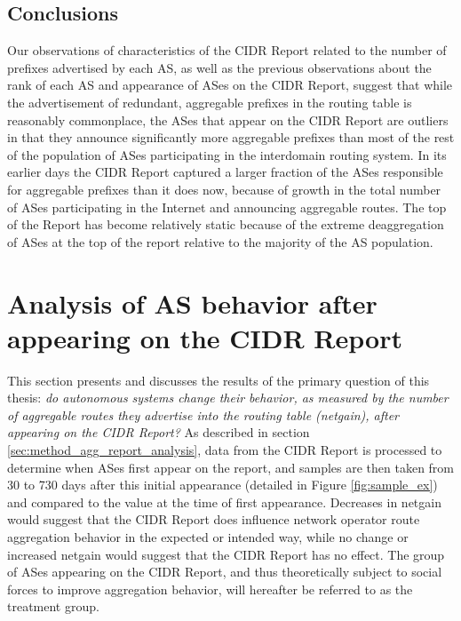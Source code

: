 
\subsection{Conclusions}

Our observations of characteristics of the CIDR Report related to the number of
prefixes advertised by each AS, as well as the previous observations about the
rank of each AS and appearance of ASes on the CIDR Report, suggest that while
the advertisement of redundant, aggregable prefixes in the routing table is
reasonably commonplace, the ASes that appear on the CIDR Report are outliers in
that they announce significantly more aggregable prefixes than most of the rest
of the population of ASes participating in the interdomain routing system. In
its earlier days the CIDR Report captured a larger fraction of the ASes
responsible for aggregable prefixes than it does now, because of growth in the
total number of ASes participating in the Internet and announcing aggregable
routes. The top of the Report has become relatively static because of the
extreme deaggregation of ASes at the top of the report relative to the majority
of the AS population.

\section{Analysis of AS behavior after appearing on the CIDR Report}

This section presents and discusses the results of the primary question of this
thesis: \emph{do autonomous systems change their behavior, as measured by the
number of aggregable routes they advertise into the routing table (netgain),
after appearing on the CIDR Report?} As described in section
\ref{sec:method_agg_report_analysis}, data from the CIDR Report is processed to
determine when ASes first appear on the report, and samples are then taken from
30 to 730 days after this initial appearance (detailed in Figure
\ref{fig:sample_ex}) and compared to the value at the time of first appearance.
Decreases in netgain would suggest that the CIDR Report does influence network
operator route aggregation behavior in the expected or intended way, while no
change or increased netgain would suggest that the CIDR Report has no effect.
The group of ASes appearing on the CIDR Report, and thus theoretically subject
to social forces to improve aggregation behavior, will hereafter be referred to
as the treatment group.

